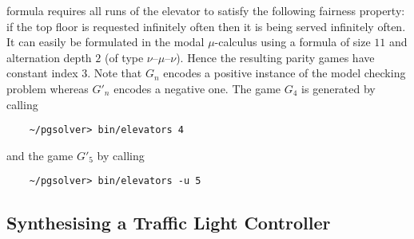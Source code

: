 formula requires all runs of the elevator to satisfy the following fairness property: if the top floor
is requested infinitely often then it is being served infinitely often. It can easily be formulated in
the modal $\mu$-calculus using a formula of size $11$ and alternation depth $2$ (of type
$\nu$--$\mu$--$\nu$). Hence the resulting parity games have constant index 3.  Note that $G_n$
encodes a positive instance of the model checking problem whereas $G'_n$ encodes a negative one.
The game $G_4$ is generated by calling
\begin{verbatim}
    ~/pgsolver> bin/elevators 4
\end{verbatim}
and the game $G'_5$ by calling
\begin{verbatim}
    ~/pgsolver> bin/elevators -u 5
\end{verbatim}

\subsection{Synthesising a Traffic Light Controller}

